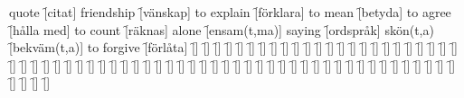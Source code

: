 \begin{questions}
    \begin{multicols}{2}
        \raggedcolumns
        \question quote \f[citat]
        \question friendship \f[vänskap]
        \question to explain \f[förklara]
        \question to mean \f[betyda]
        \question to agree \f[hålla med]
        \question to count \f[räknas]
        \question alone \f[ensam(t,ma)]
        \question saying \f[ordspråk]
        \question skön(t,a) \f[bekväm(t,a)]
        \question to forgive \f[förlåta]
        \question \f[]
        \question \f[]
        \question \f[]
        \question \f[]
        \question \f[]
        \question \f[]
        \question \f[]
        \question \f[]
        \question \f[]
        \question \f[]
        \question \f[]
        \question \f[]
        \question \f[]
        \question \f[]
        \question \f[]
        \question \f[]
        \question \f[]
        \question \f[]
        \question \f[]
        \question \f[]
        \question \f[]
        \question \f[]
        \question \f[]
        \question \f[]
        \question \f[]
        \question \f[]
        \question \f[]
        \question \f[]
        \question \f[]
        \question \f[]
        \question \f[]
        \question \f[]
        \question \f[]
        \question \f[]
        \question \f[]
        \question \f[]
        \question \f[]
        \question \f[]
        \question \f[]
        \question \f[]
        \question \f[]
        \question \f[]
        \question \f[]
        \question \f[]
        \question \f[]
        \question \f[]
        \question \f[]
        \question \f[]
        \question \f[]
        \question \f[]
        \question \f[]
        \question \f[]
        \question \f[]
        \question \f[]
        \question \f[]
        \question \f[]
        \question \f[]
        \question \f[]
        \question \f[]
        \question \f[]
        \question \f[]
        \question \f[]
        \question \f[]
        \question \f[]
        \question \f[]
        \question \f[]
        \question \f[]
        \question \f[]
    \end{multicols}
\end{questions}
